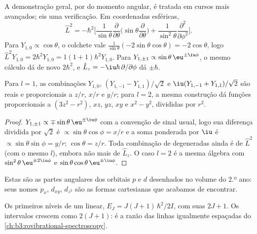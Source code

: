 A demonstração geral, por  do momento angular, é tratada
em cursos mais avançados; eis uma verificação. Em coordenadas esféricas,
\[
\hat L^2 = -\hbar^2\Big[\frac{1}{\sin\theta}\frac{\partial}{\partial\theta}
\Big(\sin\theta\frac{\partial}{\partial\theta}\Big) +
\frac{1}{\sin^2\theta}\frac{\partial^2}{\partial\phi^2}\Big].
\]
Para $Y_{1,0} \propto \cos\theta$, o colchete vale $\frac{1}{\sin\theta}(-2\sin\theta
\cos\theta) = -2\cos\theta$, logo $\hat L^2Y_{1,0} = 2\hbar^2Y_{1,0} = 1(1+1)\hbar^2
Y_{1,0}$. Para $Y_{1,\pm1} \propto \sin\theta\,\eu^{\pm\iu\phi}$, o mesmo
cálculo dá de novo $2\hbar^2$, e $\hat L_z = -\iu\hbar\,\partial/\partial
\phi$ dá $\pm\hbar$.

\begin{proposition}\label{prop:b3:quantum-model-systems:real-harmonics}
Para $l = 1$, as combinações $Y_{1,0}$, $(Y_{1,-1} - Y_{1,1})/\sqrt2$ e
$\iu(Y_{1,-1} + Y_{1,1})/\sqrt2$ são reais e proporcionais a $z/r$, $x/r$ e
$y/r$; para $l = 2$, a mesma construção dá funções proporcionais a
$(3z^2 - r^2)$, $xz$, $yz$, $xy$ e $x^2 - y^2$, divididas por $r^2$.
\end{proposition}

\begin{proof}
$Y_{1,\pm1} \propto \mp\sin\theta\,\eu^{\pm\iu\phi}$ com a convenção de sinal
usual, logo sua diferença dividida por $\sqrt2$ é $\propto\sin\theta\cos\phi =
x/r$ e a soma ponderada por $\iu$ é $\propto\sin\theta\sin\phi = y/r$;
$\cos\theta = z/r$. Toda combinação de  degeneradas ainda é
 de $\hat L^2$ (com o mesmo $l$), embora não mais de $\hat
L_z$. O caso $l = 2$ é a mesma álgebra com $\sin^2\theta\,\eu^{\pm2\iu\phi}$
e $\sin\theta\cos\theta\,\eu^{\pm\iu\phi}$.
\end{proof}

Estas são as partes angulares dos orbitais $p$ e $d$ desenhados no volume
do 2.º ano: seus nomes $p_x$, $d_{xy}$, $d_{z^2}$ são as formas cartesianas
que acabamos de encontrar.

\begin{omfigure}

{\small Os primeiros níveis de um  linear, $E_J = J(J+1)\,\hbar^2/2I$,
com suas  $2J + 1$. Os intervalos crescem como $2(J+1)$: é
a razão das linhas igualmente espaçadas do \cref{ch:b3:rovibrational-spectroscopy}.}
\end{omfigure}

